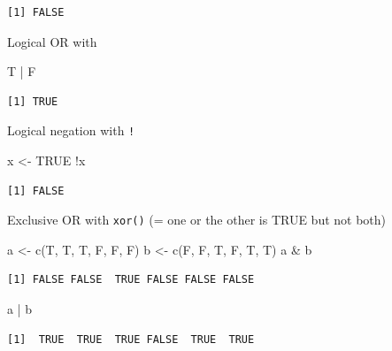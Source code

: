 \documentclass[
]{book}
\newenvironment{Shaded}{\begin{snugshade}}{\end{snugshade}}
\newcommand{\ConstantTok}[1]{\textcolor[rgb]{0.00,0.00,0.00}{#1}}
\newcommand{\FunctionTok}[1]{\textcolor[rgb]{0.00,0.00,0.00}{#1}}
\newcommand{\NormalTok}[1]{#1}
\newcommand{\OtherTok}[1]{\textcolor[rgb]{0.56,0.35,0.01}{#1}}
\newcommand{\SpecialCharTok}[1]{\textcolor[rgb]{0.00,0.00,0.00}{#1}}
\begin{document}
\begin{verbatim}
[1] FALSE
\end{verbatim}

Logical OR with \texttt{\textbar{}}

\begin{Shaded}
\begin{Highlighting}[]
\NormalTok{T }\SpecialCharTok{|}\NormalTok{ F}
\end{Highlighting}
\end{Shaded}

\begin{verbatim}
[1] TRUE
\end{verbatim}

Logical negation with \texttt{!}

\begin{Shaded}
\begin{Highlighting}[]
\NormalTok{x }\OtherTok{\textless{}{-}} \ConstantTok{TRUE}
\SpecialCharTok{!}\NormalTok{x}
\end{Highlighting}
\end{Shaded}

\begin{verbatim}
[1] FALSE
\end{verbatim}

Exclusive OR with \texttt{xor()}
(= one or the other is TRUE but not both)

\begin{Shaded}
\begin{Highlighting}[]
\NormalTok{a }\OtherTok{\textless{}{-}} \FunctionTok{c}\NormalTok{(T, T, T, F, F, F)}
\NormalTok{b }\OtherTok{\textless{}{-}} \FunctionTok{c}\NormalTok{(F, F, T, F, T, T)}
\NormalTok{a }\SpecialCharTok{\&}\NormalTok{ b}
\end{Highlighting}
\end{Shaded}

\begin{verbatim}
[1] FALSE FALSE  TRUE FALSE FALSE FALSE
\end{verbatim}

\begin{Shaded}
\begin{Highlighting}[]
\NormalTok{a }\SpecialCharTok{|}\NormalTok{ b}
\end{Highlighting}
\end{Shaded}

\begin{verbatim}
[1]  TRUE  TRUE  TRUE FALSE  TRUE  TRUE
\end{verbatim}
\end{document}
